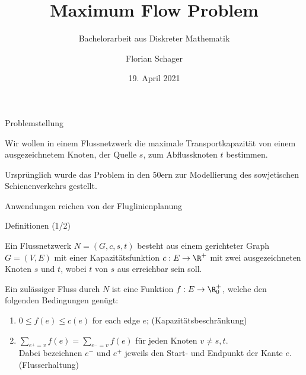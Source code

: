 \documentclass[aspectratio=169]{beamer}
\title[Maximum Flow Problem]{Maximum Flow Problem}
\subtitle{Bachelorarbeit aus Diskreter Mathematik}
\author[F. Schager]{Florian Schager}
\institute[TU Wien]{TU Wien, Vienna, Austria}
\date{19. April 2021}
\begin{document}
\begin{frame}
    \titlepage
\end{frame}


\begin{frame}{Problemstellung}
  \begin{problem*}
    Wir wollen in einem Flussnetzwerk die maximale Transportkapazität
    von einem ausgezeichnetem Knoten, der Quelle $s$, zum Abflussknoten $t$ bestimmen.
  \end{problem*}

  \begin{remark*}
    Ursprünglich wurde das Problem in den 50ern zur Modellierung des sowjetischen Schienenverkehrs gestellt.

    Anwendungen reichen von der Fluglinienplanung
  \end{remark*}
\end{frame}


\begin{frame}{Definitionen (1/2)}
  \begin{definition*}[Flussnetzwerk]
    Ein Flussnetzwerk $N = (G,c,s,t)$ besteht aus einem gerichteter Graph $G = (V,E)$ mit einer
    Kapazitätsfunktion $c: E \to \R^+$ mit zwei ausgezeichneten Knoten $s$ und $t$,
    wobei $t$ von $s$ aus erreichbar sein soll.
  \end{definition*}

  \pause

  \begin{definition*}[Fluss]
    Ein zulässiger Fluss durch $N$ ist eine Funktion $f: E \to \R_0^+$, welche
    den folgenden Bedingungen genügt:
    \begin{enumerate}
      \item<3-> $0 \leq f(e) \leq c(e)$ for each edge $e$; \quad (Kapazitätsbeschränkung)
      \item<4> $\sum_{e^+ = v} f(e) = \sum_{e^- = v} f(e)$ für jeden Knoten $v \neq s,t$. \\
      Dabei bezeichnen $e^-$ und $e^+$ jeweils den Start- und Endpunkt der Kante $e$.
      \quad (Flusserhaltung)
    \end{enumerate}
  \end{definition*}
\end{frame}
\end{document}
